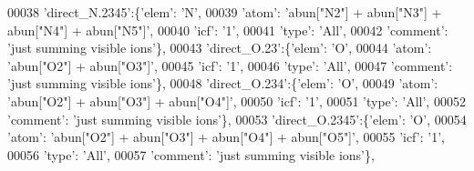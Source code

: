 \begin{DoxyCode}
00038                          \textcolor{stringliteral}{'direct\_N.2345'}:\{\textcolor{stringliteral}{'elem'}: \textcolor{stringliteral}{'N'},
00039                                        \textcolor{stringliteral}{'atom'}: \textcolor{stringliteral}{'abun["N2"] + abun["N3"] + abun["N4"] + abun["N5"]'},
00040                                        \textcolor{stringliteral}{'icf'}: \textcolor{stringliteral}{'1'},
00041                                        \textcolor{stringliteral}{'type'}: \textcolor{stringliteral}{'All'},
00042                                        \textcolor{stringliteral}{'comment'}: \textcolor{stringliteral}{'just summing visible ions'}\},
00043                          \textcolor{stringliteral}{'direct\_O.23'}:\{\textcolor{stringliteral}{'elem'}: \textcolor{stringliteral}{'O'},
00044                                        \textcolor{stringliteral}{'atom'}: \textcolor{stringliteral}{'abun["O2"] + abun["O3"]'},
00045                                        \textcolor{stringliteral}{'icf'}: \textcolor{stringliteral}{'1'},
00046                                        \textcolor{stringliteral}{'type'}: \textcolor{stringliteral}{'All'},
00047                                        \textcolor{stringliteral}{'comment'}: \textcolor{stringliteral}{'just summing visible ions'}\},
00048                          \textcolor{stringliteral}{'direct\_O.234'}:\{\textcolor{stringliteral}{'elem'}: \textcolor{stringliteral}{'O'},
00049                                        \textcolor{stringliteral}{'atom'}: \textcolor{stringliteral}{'abun["O2"] + abun["O3"] + abun["O4"]'},
00050                                        \textcolor{stringliteral}{'icf'}: \textcolor{stringliteral}{'1'},
00051                                        \textcolor{stringliteral}{'type'}: \textcolor{stringliteral}{'All'},
00052                                        \textcolor{stringliteral}{'comment'}: \textcolor{stringliteral}{'just summing visible ions'}\},
00053                          \textcolor{stringliteral}{'direct\_O.2345'}:\{\textcolor{stringliteral}{'elem'}: \textcolor{stringliteral}{'O'},
00054                                        \textcolor{stringliteral}{'atom'}: \textcolor{stringliteral}{'abun["O2"] + abun["O3"] + abun["O4"] + abun["O5"]'},
00055                                        \textcolor{stringliteral}{'icf'}: \textcolor{stringliteral}{'1'},
00056                                        \textcolor{stringliteral}{'type'}: \textcolor{stringliteral}{'All'},
00057                                        \textcolor{stringliteral}{'comment'}: \textcolor{stringliteral}{'just summing visible ions'}\},

\end{DoxyCode}

